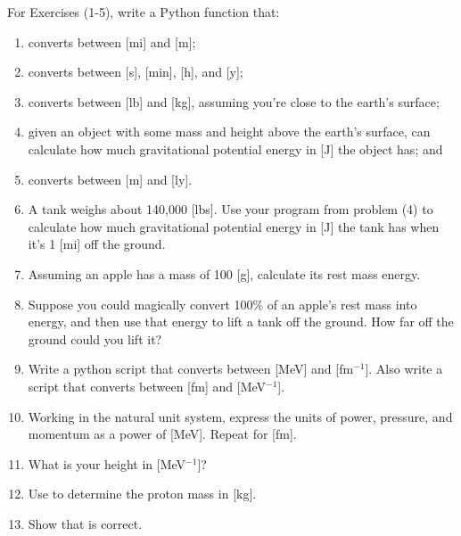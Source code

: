 For Exercises (1-5), write a Python function that:
\begin{enumerate}
    \item converts between [mi] and [m];
    \item converts between [s], [min], [h], and [y];
    \item converts between [lb] and [kg], assuming you’re close to the earth’s surface;
    \item given an object with some mass and height above the earth’s surface, can 
          calculate how much gravitational potential energy in [J] the object has; and
    \item converts between [m] and [ly].
    \item A tank weighs about 140,000 [lbs]. Use your program from problem (4) 
          to calculate how much gravitational potential energy in [J] the tank has when 
          it’s 1 [mi] off the ground.
    \item Assuming an apple has a mass of 100 [g], calculate its rest mass energy.
    \item Suppose you could magically convert 100\% of an apple’s rest mass into energy, 
          and then use that energy to lift a tank off the ground. How far off the 
          ground could you lift it?
    \item Write a python script that converts between [MeV] and [fm$^{-1}$].
          Also write a script that converts between [fm] and [MeV$^{-1}$].
    \item Working in the natural unit system, express the units of power, pressure,
          and momentum as a power of [MeV]. Repeat for [fm].
    \item What is your height in [MeV$^{-1}$]?
    \item Use  to determine the proton mass in [kg].
    \item Show that  is correct.
\end{enumerate}



